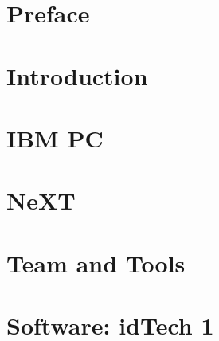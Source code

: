 \documentclass{book}
\begin{document}
    \pagebreak

     \chapter*{Preface}
       
    

    \chapter{Introduction}
      

   
      \chapter{IBM PC}
        
        
        
        
        
        
            

        


        
     \chapter{NeXT}
          


    

    \chapter{Team and Tools}
       
       
       
      
      
      
      
      




     \chapter{Software: idTech 1}
      
      
      
      
       
       
       
       
       
       
       
       
          
        
      
\end{document}
